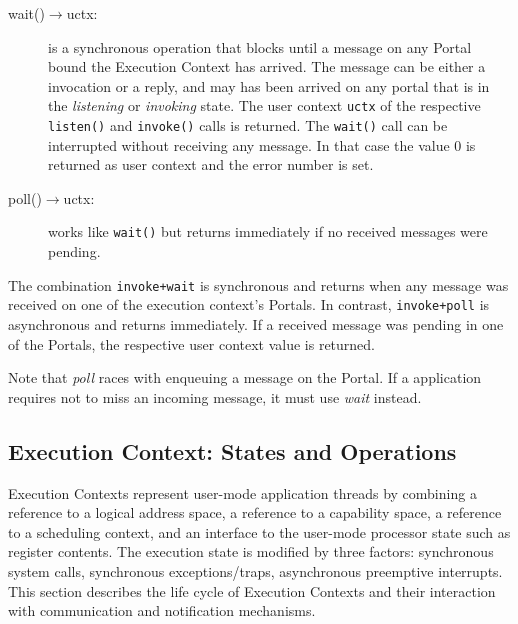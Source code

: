 \begin{description}
\item[wait()$\rightarrow$uctx:] is a synchronous operation that blocks until a message on any Portal bound the Execution Context has arrived. The message can be either a invocation or a reply, and may has been arrived on any portal that is in the \emph{listening} or \emph{invoking} state. The user context \texttt{uctx} of the respective \texttt{listen()} and \texttt{invoke()} calls is returned. The \texttt{wait()} call can be interrupted without receiving any message. In that case the value 0 is returned as user context and the error number is set.

\item[poll()$\rightarrow$uctx:] works like \texttt{wait()} but returns immediately if no received messages were pending.
\end{description}

The combination \texttt{invoke+wait} is synchronous and returns when any message was received on one of the execution context's Portals. In contrast, \texttt{invoke+poll} is asynchronous and returns immediately. If a received message was pending in one of the Portals, the respective user context value is returned.

Note that \emph{poll} races with enqueuing a message on the Portal. If a application requires not to miss an incoming message, it must use \emph{wait} instead.




\subsection{Execution Context: States and Operations}
\label{sec:execution-context-dyn}

Execution Contexts  represent user-mode application threads by combining a reference to a logical address space, a reference to a capability space, a reference to a scheduling context, and an interface to the user-mode processor state such as register contents. The execution state is modified by three factors: synchronous system calls, synchronous exceptions/traps, asynchronous preemptive interrupts. This section describes the life cycle of Execution Contexts and their interaction with communication and notification mechanisms.

